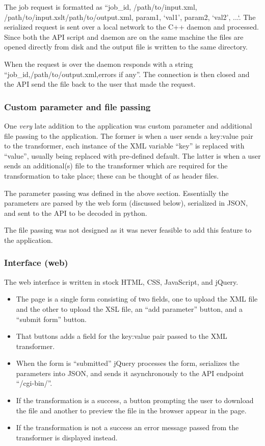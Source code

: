 The job request is formatted as ``job\_id,  /path/to/input.xml, /path/to/input.xslt/path/to/output.xml, param1, `val1', param2, `val2', ...`.
The serialized request is sent over a local network to the C++ daemon and processed.
Since both the API script and daemon are on the same machine the files are opened directly from disk and the output file is written to the same directory.

When the request is over the daemon responds with a string ``job\_id,/path/to/output.xml,errors if any''.
The connection is then closed and the API send the file back to the user that made the request.

\subsubsection{Custom parameter and file passing}

One \textit{very} late addition to the application was custom parameter and additional file passing to the application.
The former is when a user sends a key:value pair to the transformer, each instance of the XML variable ``key'' is replaced with ``value'', usually being replaced with pre-defined default.
The latter is when a user sends an additional(s) file to the transformer which are required for the transformation to take place; these can be thought of as header files.

The parameter passing was defined in the above section.
Essentially the parameters are parsed by the web form (discussed below), serialized in JSON, and sent to the API to be decoded in python.

The file passing was not designed as it was never feasible to add this feature to the application.

\subsubsection{Interface (web)}

The web interface is written in stock HTML, CSS, JavaScript, and jQuery.

\begin{itemize}
  \item The page is a single form consisting of two fields, one to upload the XML file and the other to upload the XSL file, an ``add parameter'' button, and a ``submit form'' button.
  \item That buttons adds a field for the key:value pair passed to the XML transformer.
  \item When the form is ``submitted'' jQuery processes the form, serializes the parameters into JSON, and sends it asynchronously to the API endpoint ``/cgi-bin/''.
  \item If the transformation is a success, a button prompting the user to download the file and another to preview the file in the browser appear in the page.
  \item If the transformation is not a success an error message passed from the transformer is displayed instead.
\end{itemize}

